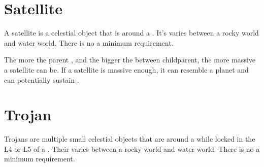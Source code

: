 \documentclass[letterpaper,10pt,english]{sphinxmanual}
\begin{document}
\section{Satellite}
\label{\detokenize{celestial_bodies/satellite:satellite}}\label{\detokenize{celestial_bodies/satellite::doc}}\label{\detokenize{celestial_bodies/satellite:id1}}
\sphinxAtStartPar
A satellite is a celestial object that is {\hyperref[\detokenize{quantities/orbital/orbital:id1}]{}}
around a {\hyperref[\detokenize{celestial_bodies/planet:id1}]{}}. It’s {\hyperref[\detokenize{quantities/material/composition_type:id1}]{}}
varies between a rocky world and water world.
There is no a minimum {\hyperref[\detokenize{quantities/material/mass:id1}]{}} requirement.

\sphinxAtStartPar
The more {\hyperref[\detokenize{quantities/material/mass:id1}]{}} the parent {\hyperref[\detokenize{celestial_bodies/planet:id1}]{}},
and the bigger the {\hyperref[\detokenize{quantities/orbital/semi_major_axis:id1}]{}} between child\sphinxhyphen{}parent,
the more massive a satellite can be.
If a satellite is massive enough, it can resemble a planet and can
potentially sustain {\hyperref[\detokenize{quantities/habitability/habitability:id1}]{}}.


\section{Trojan}
\label{\detokenize{celestial_bodies/trojan:trojan}}\label{\detokenize{celestial_bodies/trojan::doc}}\label{\detokenize{celestial_bodies/trojan:id1}}
\sphinxAtStartPar
Trojans are multiple small celestial objects that are {\hyperref[\detokenize{quantities/orbital/orbital:id1}]{}} around a {\hyperref[\detokenize{celestial_bodies/star:id1}]{}}
while locked in the L4 or L5 {\hyperref[\detokenize{quantities/orbital/lagrange_position:id1}]{}} of a {\hyperref[\detokenize{celestial_bodies/planet:id1}]{}}.
Their {\hyperref[\detokenize{quantities/material/composition_type:id1}]{}}
varies between a rocky world and water world.
There is no a minimum {\hyperref[\detokenize{quantities/material/mass:id1}]{}} requirement.
\end{document}
